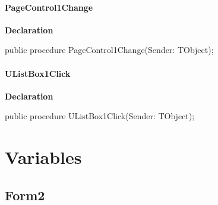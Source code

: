 \documentclass{report}
\newif\ifpdf
\begin{document}
\paragraph*{PageControl1Change}\hspace*{\fill}

\label{settings.TForm2-PageControl1Change}
\begin{list}{}{
\setlength{\itemindent}{0cm}
\setlength{\listparindent}{0cm}
\setlength{\leftmargin}{\evensidemargin}
\addtolength{\leftmargin}{\tmplength}
\settowidth{\labelsep}{X}
\addtolength{\leftmargin}{\labelsep}
\setlength{\labelwidth}{\tmplength}
}
\item[\textbf{Declaration}\hfill]
\ifpdf
\begin{flushleft}
\fi
\begin{ttfamily}
public procedure PageControl1Change(Sender: TObject);\end{ttfamily}

\ifpdf
\end{flushleft}
\fi

\end{list}
\paragraph*{UListBox1Click}\hspace*{\fill}

\label{settings.TForm2-UListBox1Click}
\begin{list}{}{
\setlength{\itemindent}{0cm}
\setlength{\listparindent}{0cm}
\setlength{\leftmargin}{\evensidemargin}
\addtolength{\leftmargin}{\tmplength}
\settowidth{\labelsep}{X}
\addtolength{\leftmargin}{\labelsep}
\setlength{\labelwidth}{\tmplength}
}
\item[\textbf{Declaration}\hfill]
\ifpdf
\begin{flushleft}
\fi
\begin{ttfamily}
public procedure UListBox1Click(Sender: TObject);\end{ttfamily}

\ifpdf
\end{flushleft}
\fi

\end{list}
\section{Variables}
\ifpdf
\subsection*{\large{\textbf{Form2}}\normalsize\hspace{1ex}\hrulefill}
\else
\end{document}
